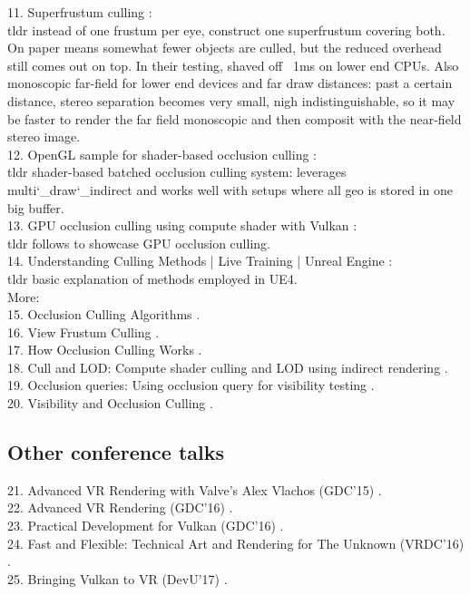 11. Superfrustum culling \cite{Whiting.2017}: \\
tldr instead of one frustum per eye, construct one superfrustum covering both. On paper means somewhat fewer objects are culled, but the reduced overhead still comes out on top. In their testing, shaved off ~1ms on lower end CPUs. Also monoscopic far-field for lower end devices and far draw distances: past a certain distance, stereo separation becomes very small, nigh indistinguishable, so it may be faster to render the far field monoscopic and then composit with the near-field stereo image.\\

12. OpenGL sample for shader-based occlusion culling \cite{Kubisch.2014}: \\
tldr shader-based batched occlusion culling system: leverages multi\char`_draw\char`_indirect and works well with setups where all geo is stored in one big buffer.\\

13. GPU occlusion culling using compute shader with Vulkan \cite{sydneyzh.2018}: \\
tldr follows \cite{Anagnostou.2017} to showcase GPU occlusion culling.\\

14. Understanding Culling Methods | Live Training | Unreal Engine \cite{Hobson.2019}: \\
tldr basic explanation of methods employed in UE4.\\

More:\\
15. Occlusion Culling Algorithms \cite{Haines.1999}. \\
16. View Frustum Culling \cite{Lighthouse3d.com.2011}.\\
17. How Occlusion Culling Works \cite{thebennybox.2018}.\\
18. Cull and LOD: Compute shader culling and LOD using indirect rendering \cite{Willems.2016.6}.\\
19. Occlusion queries: Using occlusion query for visibility testing \cite{Willems.2016.4}.\\
20. Visibility and Occlusion Culling \cite{EpicGamesInc..n.d.}.\\

\subsection{Other conference talks}
21. Advanced VR Rendering with Valve's Alex Vlachos (GDC'15) \cite{Vlachos.2016}.\\
22. Advanced VR Rendering (GDC'16) \cite{Vlachos.2016b}.\\
23. Practical Development for Vulkan (GDC'16) \cite{Ginsburg.2016}.\\
24. Fast and Flexible: Technical Art and Rendering for The Unknown (VRDC'16) \cite{Answer.2016}.\\
25. Bringing Vulkan to VR (DevU'17) \cite{Everitt.2017}.\\

